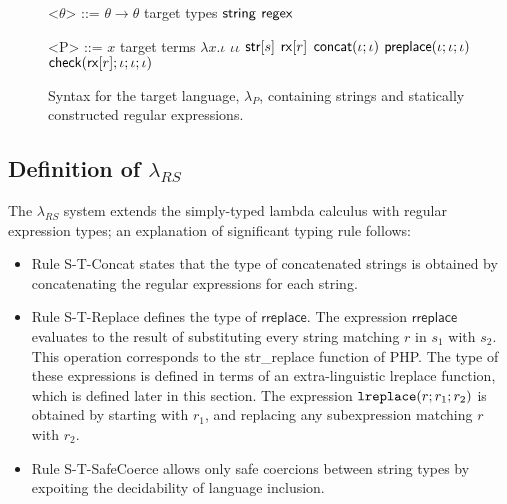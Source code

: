 \documentclass[9pt]{sig-alternate}
\theoremstyle{definition}
\newcommand{\lambdas}{\lambda_{RS}}
\newcommand{\lambdap}{\lambda_P}
\newcommand{\sisubst}[3]{{\sf rreplace}[#1](#2;#3)} \newcommand{\rreplace}[3]{{\sf rreplace}[#1](#2;#3)} %
\newcommand{\coerce}[2]{ {\sf rcoerce}[#1](#2)}
\newcommand{\sistr}[1]{{\sf rstr}[#1]}   \newcommand{\rstr}[1]{{\sf rstr}[#1]} %
\newcommand{\strin}[1]{\sistr{#1}}
\newcommand{\rsconcat}[2]{{\sf rconcat}(#1;#2)} \newcommand{\rconcat}[2]{{\sf rconcat}(#1;#2)} %
\newcommand{\stringin}[1]{{\sf stringin}[#1]}
\newcommand{\tcheck}[4]{{\sf check}(#1; #2; #3; #4)}
\renewcommand{\tstr}[1]{{{\sf str}[#1]}}
\newcommand{\preplace}[3]{{\sf preplace}(#1;#2;#3)}
\newcommand{\tconcat}[2]{{\sf concat}(#1;#2)} \newcommand{\concat}[2]{{\sf concat}(#1;#2)} %
\newcommand{\rx}[1]{ {\sf rx}[#1] }
\newcommand{\str}{{\sf string}}
\newcommand{\regex}{{\sf regex}}
\newcommand{\lreplace}[3]{{\tt lreplace}(#1; #2; #3)}
\begin{document}




\begin{figure}[h]
\begin{grammar}

<$\theta$> ::= $\theta \rightarrow \theta$ \hfill target types \alt
$\str$ \alt $\regex$


<P> ::= $x$  \hfill target terms \alt
   $\lambda x . \iota$ \alt
   $\iota \iota$ \alt
  $\tstr{s}$ \alt
  $\rx{r}$ \alt
  $\tconcat{\iota}{\iota}$ \alt
  $\preplace{\iota}{\iota}{\iota}$ \alt
  $\tcheck{\rx{r}}{\iota}{\iota}{\iota}$ 
  \end{grammar}
\caption{Syntax for the target language, $\lambdap$, containing strings and statically constructed regular expressions.}
\label{fig:lcsSyntax}
\end{figure}

\subsection{Definition of $\lambdas$}

The $\lambdas$ system extends the simply-typed lambda calculus with regular
expression types; an explanation of significant typing rule follows:
\begin{itemize}
  \item Rule S-T-Concat states that the type of concatenated strings is 
    obtained by concatenating the regular expressions for each string.
  \item Rule S-T-Replace defines the type of $\textsf{rreplace}$. The expression $\textsf{rreplace}$
    evaluates to the result of substituting every string matching $r$ in $s_1$
    with $s_2$. This operation corresponds to the \textsf{str_replace} function of PHP.
    The type of these expressions is defined in terms of an extra-linguistic \textsf{lreplace}
    function, which is defined later in this section.
    The expression $\lreplace{r}{r_1}{r_2}$ is obtained by
    starting with $r_1$, and replacing any subexpression matching $r$ with $r_2$.
  \item Rule S-T-SafeCoerce allows only safe coercions between string types by
    expoiting the decidability of language inclusion.
\end{itemize}
\end{document}
